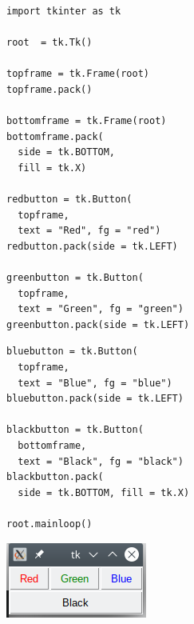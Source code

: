 \begin{frame}[fragile]
%
\begin{minipage}{.49\linewidth}
\begin{codebox}
\begin{verbatim}
import tkinter as tk

root  = tk.Tk()

topframe = tk.Frame(root)
topframe.pack()

bottomframe = tk.Frame(root)
bottomframe.pack(
  side = tk.BOTTOM,
  fill = tk.X)

redbutton = tk.Button(
  topframe,
  text = "Red", fg = "red")
redbutton.pack(side = tk.LEFT)

greenbutton = tk.Button(
  topframe,
  text = "Green", fg = "green")
greenbutton.pack(side = tk.LEFT)
\end{verbatim}
\end{codebox}
\end{minipage}
%
\begin{minipage}{.49\linewidth}
\begin{codebox}[... Continued]
\begin{verbatim}
bluebutton = tk.Button(
  topframe,
  text = "Blue", fg = "blue")
bluebutton.pack(side = tk.LEFT)

blackbutton = tk.Button(
  bottomframe,
  text = "Black", fg = "black")
blackbutton.pack(
  side = tk.BOTTOM, fill = tk.X)

root.mainloop()
\end{verbatim}
\end{codebox}
\begin{tcolorbox}[title=Output: Buttons and Frames]
\begin{center}
\includegraphics[width=.49\linewidth]{./gfx/tk-buttonsframe}
\end{center}
\end{tcolorbox}
\end{minipage}
%
\end{frame}


